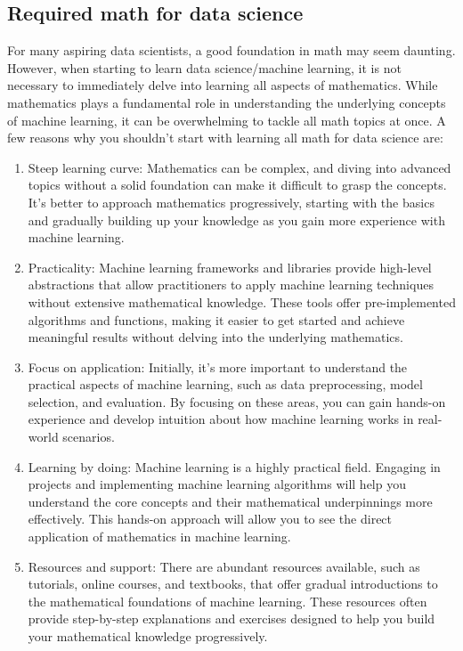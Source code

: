 \documentclass[10pt]{extarticle}
\newcommand{\<}{\langle}
\renewcommand{\>}{\rangle}
\theoremstyle{mystyle}{\newtheorem*{remark}{Remark}}
\theoremstyle{mystyle}{\newtheorem*{remarks}{Remarks}}
\theoremstyle{mystyle}{\newtheorem*{example}{Example}}
\theoremstyle{mystyle}{\newtheorem*{examples}{Examples}}
\theoremstyle{definition}{\newtheorem*{exercise}{Exercise}}
\theoremstyle{warn}
\begin{document}
\subsection{Required math for data science}
For many aspiring data scientists, a good foundation in math may seem daunting. However, when starting to learn data science/machine learning, it is not necessary to immediately delve into learning all aspects of mathematics. While mathematics plays a fundamental role in understanding the underlying concepts of machine learning, it can be overwhelming to tackle all math topics at once. A few reasons why you shouldn't start with learning all math for data science are:

\begin{enumerate}
\item Steep learning curve: Mathematics can be complex, and diving into advanced topics without a solid foundation can make it difficult to grasp the concepts. It's better to approach mathematics progressively, starting with the basics and gradually building up your knowledge as you gain more experience with machine learning.

\item Practicality: Machine learning frameworks and libraries provide high-level abstractions that allow practitioners to apply machine learning techniques without extensive mathematical knowledge. These tools offer pre-implemented algorithms and functions, making it easier to get started and achieve meaningful results without delving into the underlying mathematics.

\item Focus on application: Initially, it's more important to understand the practical aspects of machine learning, such as data preprocessing, model selection, and evaluation. By focusing on these areas, you can gain hands-on experience and develop intuition about how machine learning works in real-world scenarios.

\item Learning by doing: Machine learning is a highly practical field. Engaging in projects and implementing machine learning algorithms will help you understand the core concepts and their mathematical underpinnings more effectively. This hands-on approach will allow you to see the direct application of mathematics in machine learning.

\item Resources and support: There are abundant resources available, such as tutorials, online courses, and textbooks, that offer gradual introductions to the mathematical foundations of machine learning. These resources often provide step-by-step explanations and exercises designed to help you build your mathematical knowledge progressively.


\end{enumerate}
\end{document}
